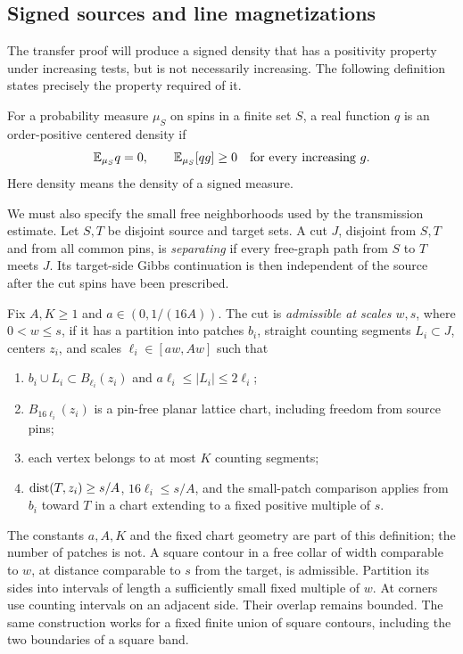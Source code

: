 \subsection{Signed sources and line magnetizations}

The transfer proof will produce a signed density that has a positivity
property under increasing tests, but is not necessarily increasing.
The following definition states precisely the property required of it.

\begin{definition}
\label{def:pure-order-positive}
For a probability measure \(\mu_S\) on spins in a finite set \(S\), a
real function \(q\) is an order-positive centered density if
\[
 \mathbb E_{\mu_S}q=0,\qquad \mathbb E_{\mu_S}[qg]\ge0
 \quad\hbox{for every increasing }g.
\]
Here density means the density of a signed measure.
\end{definition}

We must also specify the small free neighborhoods used by the
transmission estimate. Let \(S,T\) be disjoint source and target sets.
A cut \(J\), disjoint from \(S,T\) and from all common pins, is
\emph{separating} if every free-graph path from \(S\) to \(T\) meets
\(J\). Its target-side Gibbs continuation is then independent of the
source after the cut spins have been prescribed.

Fix \(A,K\ge1\) and \(a\in(0,1/(16A))\). The cut is
\emph{admissible at scales \(w,s\)}, where \(0<w\le s\), if it has a
partition into patches \(b_i\), straight counting segments
\(L_i\subset J\), centers \(z_i\), and scales
\(\ell_i\in[aw,Aw]\) such that
\begin{enumerate}
\item \(b_i\cup L_i\subset B_{\ell_i}(z_i)\) and
\(a\ell_i\le |L_i|\le2\ell_i\);
\item \(B_{16\ell_i}(z_i)\) is a pin-free planar lattice chart,
including freedom from source pins;
\item each vertex belongs to at most \(K\) counting segments;
\item \(\operatorname{dist}(T,z_i)\ge s/A\), \(16\ell_i\le s/A\), and the
small-patch comparison applies from \(b_i\) toward \(T\) in a chart
extending to a fixed positive multiple of \(s\).
\end{enumerate}
The constants \(a,A,K\) and the fixed chart geometry are part of this
definition; the number of patches is not. A square contour in a free
collar of width comparable to \(w\), at distance comparable to \(s\)
from the target, is admissible. Partition its sides into intervals of
length a sufficiently small fixed multiple of \(w\). At corners use
counting intervals on an adjacent side. Their overlap remains bounded.
The same construction works for a fixed finite union of square contours,
including the two boundaries of a square band.

